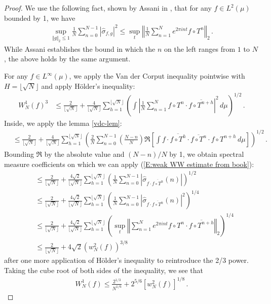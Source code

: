 \documentclass[11pt, oneside]{amsart}   	%
\newcommand{\1}{\mathbbm{1}}
\newcommand{\floor}[1]{\lfloor#1\rfloor}
\theoremstyle{definition}
\begin{document}
\begin{proof} We use the following fact, shown by Assani in \cite{assani04}, that for any $f\in L^2(\mu)$ bounded by 1, we have 
\begin{align}\label{E:weak WW estimate from book}
\sup_{\Vert g\Vert_2 \leq 1} \frac{1}{N} \sum_{n=0}^{N-1} |\hat\sigma_{f, g} |^{2} \leq \sup_t \left \Vert \frac{1}{N} \sum_{n=1}^N e^{2\pi i n t} f \circ T^n \right\Vert_2 \, .
\end{align}
While Assani establishes the bound in which the $n$ on the left ranges from $1$ to $N$, the above holds by the same argument.

For any $f\in L^\infty(\mu)$, we apply the Van der Corput inequality pointwise with $H = \floor{\sqrt{N}}$ and apply Hölder's inequality:
\begin{align*}
W_N^1(f)^3 &\leq \frac{2}{\floor{\sqrt{N}}} + \frac{4}{\floor{\sqrt{N}}}\sum_{h=1}^{\floor{\sqrt{N}}} \left( \int \left| \frac{1}{N} \sum_{n=1}^N f\circ T^n \cdot \overline{f \circ T^{n+h}} \right|^2 \, d\mu \right)^{1/2} \, .
\end{align*}
Inside, we apply the lemma \ref{vdc-lem}:
\begin{align*}
&\leq \frac{2}{\floor{\sqrt{N}}} + \frac{4}{\floor{\sqrt{N}}}\sum_{h=1}^{\floor{\sqrt{N}}} \left( \frac{2}{N} \sum_{n=0}^{N-1} \left( \frac{N-n}{N}\right) \Re \left[ \int f \cdot \overline{f \circ T^{h}} \cdot \overline{f \circ T^n} \cdot f \circ T^{n+h} \, d\mu \right] \right)^{1/2} \, .
\end{align*}
Bounding $\Re$ by the absolute value and $(N-n)/N$ by 1, we obtain spectral measure coefficients on which we can apply (\ref{E:weak WW estimate from book}):
\begin{align*}
&\leq \frac{2}{\floor{\sqrt{N}}} + \frac{4\sqrt{2}}{\floor{\sqrt{N}}}\sum_{h=1}^{\floor{\sqrt{N}}} \left( \frac{1}{N} \sum_{n=0}^{N-1} |\hat \sigma_{f \cdot \overline{f\circ T^h}} (n)| \right)^{1/2} \\
&\leq \frac{2}{\floor{\sqrt{N}}} + \frac{4\sqrt{2}}{\floor{\sqrt{N}}}\sum_{h=1}^{\floor{\sqrt{N}}} \left( \frac{1}{N} \sum_{n=0}^{N-1} |\hat \sigma_{f \cdot \overline{f\circ T^h}} (n)|^2 \right)^{1/4} \\
&\leq \frac{2}{\floor{\sqrt{N}}} + \frac{4\sqrt{2}}{\floor{\sqrt{N}}}\sum_{h=1}^{\floor{\sqrt{N}}} \left( \sup_t \left\Vert \sum_{n=1}^N e^{2\pi i n t} f\circ T^n \cdot \overline{f\circ T^{n + h}}\right\Vert_2 \right)^{1/4} \\
&\leq \frac{2}{\floor{\sqrt{N}}} + 4\sqrt{2} \left( w_{N}^2(f) \right)^{3/8}
\end{align*}
after one more application of Hölder's inequality to reintroduce the 2/3 power. Taking the cube root of both sides of the inequality, we see that
\begin{align}\label{E:weak bound k=1 case}
W_N^1(f) \leq \frac{2^{1/3}}{N^{1/6}} + 2^{5/6} \left[w_N^2(f)\right]^{1/8} \, .
\end{align}


\end{proof}
\end{document}
